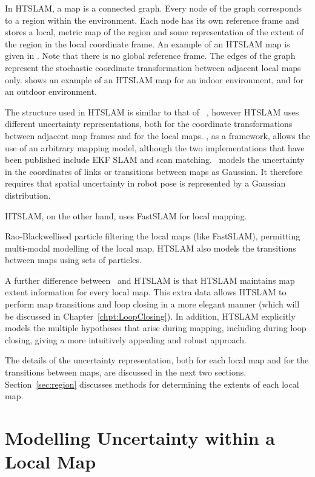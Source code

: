 In HTSLAM, a map is a connected graph. Every node of the graph
corresponds to a region within the environment. Each node has its own
reference frame and stores a local, metric map of the region and some
representation of the extent of the region in the local coordinate
frame. An example of an HTSLAM map is given in 
. Note that there is no global reference
frame. The edges of the graph represent the stochastic coordinate
transformation between adjacent local maps
only.  shows an example of an
HTSLAM map for an indoor environment, and
 for an outdoor environment.

The structure used in HTSLAM is similar to that of \Atlas\
\cite{bosse02atlas}, however HTSLAM uses different uncertainty
representations, both for the coordinate transformations between
adjacent map frames and for the local maps.  \Atlas, as a framework,
allows the use of an arbitrary mapping model, although the two implementations
that have been published include EKF SLAM and scan matching. \Atlas\
models the uncertainty in the coordinates of links or transitions between maps as Gaussian.
It therefore requires that spatial uncertainty in robot pose is represented by a 
Gaussian distribution. 

HTSLAM, on the other hand,  uses FastSLAM for local mapping.


Rao-Blackwellised particle filtering  the local maps (like FastSLAM),
permitting multi-modal modelling of the local map. HTSLAM also models
the transitions between maps using sets of particles.

A further difference between \Atlas\ and HTSLAM is that HTSLAM
maintains map extent information for every local map. This extra data
allows HTSLAM to perform map transitions and loop closing in a more
elegant manner (which will be discussed in
Chapter~\ref{chpt:LoopClosing}). In addition, HTSLAM explicitly
models the multiple hypotheses that arise during mapping, including
during loop closing, giving a more intuitively appealing and robust
approach.

The details of the uncertainty representation, both for each local map
and for the transitions between maps, are discussed in the next two
sections.  Section~\ref{sec:region} discusses methods for
determining the extents of each local map.

\section{Modelling Uncertainty within a Local Map}
\label{sec:local_map}


